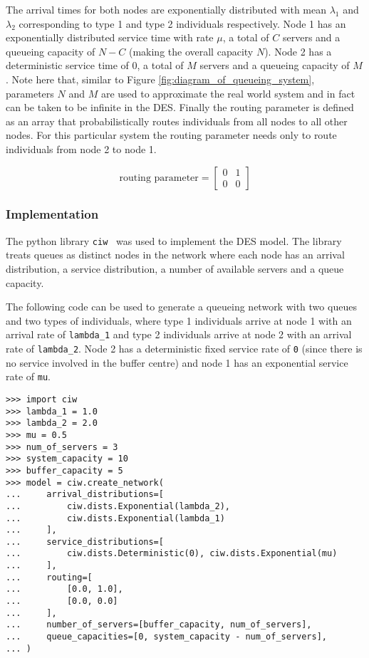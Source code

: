 The arrival times for both nodes are exponentially distributed with
mean \(\lambda_1\) and \(\lambda_2\) corresponding to type 1 and type 2
individuals respectively.
Node 1 has an exponentially distributed service time with rate \(\mu\),
a total of \(C\) servers and a queueing capacity of \(N - C\) (making the
overall capacity \(N\)). 
Node 2 has a deterministic service time of \(0\), a total of \(M\)
servers and a queueing capacity of \(M\).
Note here that, similar to Figure \ref{fig:diagram_of_queueing_system},
parameters \(N\) and \(M\) are used to approximate the real world system 
and in fact can be taken to be infinite in the DES.
Finally the routing parameter is defined as an array that probabilistically
routes individuals from all nodes to all other nodes.
For this particular system the routing parameter needs only to route individuals
from node 2 to node 1.

\begin{equation}
    \text{routing parameter} = \left[
    \begin{array}{cc}
        0 & 1 \\
        0 & 0
    \end{array}
    \right]
\end{equation}


\subsubsection{Implementation}
The python library \lstinline[style=pystyle]{ciw}~\cite{ciwpython, ciwarticle}
was used to implement the DES model.
The library treats queues as distinct nodes in the network where each node has
an arrival distribution, a service distribution, a number of available servers
and a queue capacity.

The following code can be used to generate a queueing network with two
queues and two types of individuals, where type 1 individuals arrive at node
1 with an arrival rate of \lstinline[style=pystyle]{lambda_1} and type 2
individuals arrive at node 2 with an arrival rate of
\lstinline[style=pystyle]{lambda_2}.
Node 2 has a deterministic fixed service rate of
\lstinline[style=pystyle]{0} (since there is no service involved in the buffer
centre) and node 1 has an exponential service rate of
\lstinline[style=pystyle]{mu}.

\begin{lstlisting}[style=pystyle]
>>> import ciw
>>> lambda_1 = 1.0
>>> lambda_2 = 2.0
>>> mu = 0.5
>>> num_of_servers = 3
>>> system_capacity = 10
>>> buffer_capacity = 5
>>> model = ciw.create_network(
...     arrival_distributions=[
...         ciw.dists.Exponential(lambda_2),
...         ciw.dists.Exponential(lambda_1)
...     ],
...     service_distributions=[
...         ciw.dists.Deterministic(0), ciw.dists.Exponential(mu)
...     ],
...     routing=[
...         [0.0, 1.0],
...         [0.0, 0.0]
...     ],
...     number_of_servers=[buffer_capacity, num_of_servers],
...     queue_capacities=[0, system_capacity - num_of_servers],
... )

\end{lstlisting}

